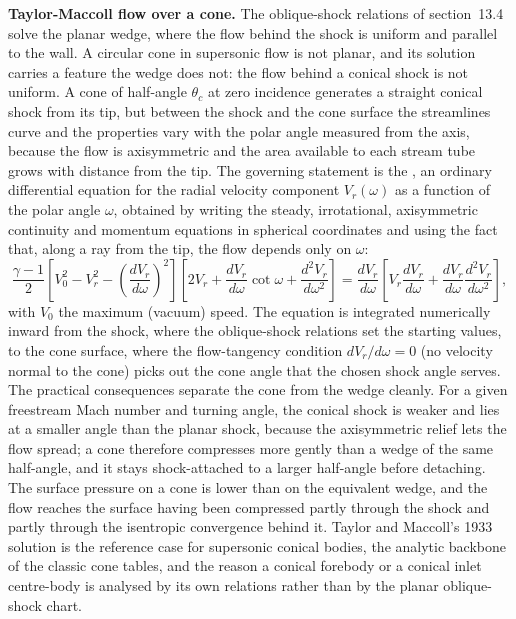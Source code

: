 \begin{mastery}
\textbf{Taylor-Maccoll flow over a cone.} The oblique-shock relations of
section~13.4 solve the planar wedge, where the flow behind the shock is
uniform and parallel to the wall. A circular cone in supersonic flow is
not planar, and its solution carries a feature the wedge does not: the
flow behind a conical shock is not uniform. A cone of half-angle
$\theta_c$ at zero incidence generates a straight conical shock from its
tip, but between the shock and the cone surface the streamlines curve and
the properties vary with the polar angle measured from the axis, because
the flow is axisymmetric and the area available to each stream tube grows
with distance from the tip. The governing statement is the
, an ordinary differential equation for
the radial velocity component $V_r(\omega)$ as a function of the polar
angle $\omega$, obtained by writing the steady, irrotational,
axisymmetric continuity and momentum equations in spherical coordinates
and using the fact that, along a ray from the tip, the flow depends only
on $\omega$:
\[
\frac{\gamma - 1}{2}\left[V_0^2 - V_r^2 -
\left(\frac{dV_r}{d\omega}\right)^2\right]\!\left[2V_r +
\frac{dV_r}{d\omega}\cot\omega + \frac{d^2 V_r}{d\omega^2}\right]
= \frac{dV_r}{d\omega}\!\left[V_r\frac{dV_r}{d\omega} +
\frac{dV_r}{d\omega}\frac{d^2 V_r}{d\omega^2}\right],
\]
with $V_0$ the maximum (vacuum) speed. The equation is integrated
numerically inward from the shock, where the oblique-shock relations set
the starting values, to the cone surface, where the flow-tangency
condition $dV_r/d\omega = 0$ (no velocity normal to the cone) picks out
the cone angle that the chosen shock angle serves. The practical
consequences separate the cone from the wedge cleanly. For a given
freestream Mach number and turning angle, the conical shock is weaker and
lies at a smaller angle than the planar shock, because the axisymmetric
relief lets the flow spread; a cone therefore compresses more gently than
a wedge of the same half-angle, and it stays shock-attached to a larger
half-angle before detaching. The surface pressure on a cone is lower than
on the equivalent wedge, and the flow reaches the surface having been
compressed partly through the shock and partly through the isentropic
convergence behind it. Taylor and Maccoll's 1933 solution is the
reference case for supersonic conical bodies, the analytic backbone of
the classic cone tables, and the reason a conical forebody or a conical
inlet centre-body is analysed by its own relations rather than by the
planar oblique-shock chart.
\end{mastery}

